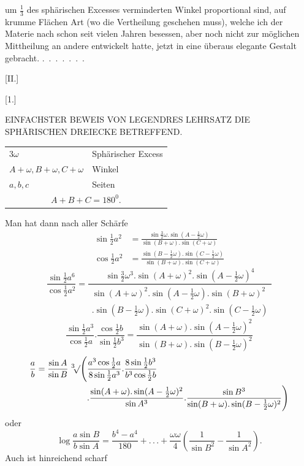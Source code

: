 %
um $\frac13$ des sphärischen Excesses verminderten Winkel proportional sind, auf krumme Flächen  Art (wo die Vertheilung  geschehen muss), welche ich der Materie nach schon seit vielen Jahren besessen, aber noch nicht zur möglichen Mittheilung an andere entwickelt hatte, jetzt in eine überaus elegante Gestalt gebracht. \mbox{. . . . . . .}
\par{}
\begin{center}[II.]\end{center}
\begin{center}[1.]\end{center}
\begin{center}EINFACHSTER BEWEIS VON LEGENDRES LEHRSATZ DIE SPHÄRISCHEN DREIECKE BETREFFEND.\end{center}
\begin{center}\begin{tabular}{ll}
$3\omega$ & Sphärischer Excess\\
$A+\omega,B+\omega,C+\omega$ & Winkel\\
$a,b,c$ & Seiten\\
\multicolumn{2}{c}{$A+B+C=180^0.$}
\end{tabular}\end{center}
\noindent\hspace*{1.2em}Man hat dann nach aller Schärfe
\[
\begin{aligned}
\sin\tfrac12 a^2&=\frac{\sin\tfrac32\omega.\sin(A-\tfrac12\omega)}{\sin(B+\omega).\sin(C+\omega)}\\
\cos\tfrac12 a^2&=\frac{\sin(B-\tfrac12\omega).\sin(C-\tfrac12\omega)}{\sin(B+\omega).\sin(C+\omega)}
\end{aligned}
\]
\[
\frac{\sin\frac12 a^6}{\cos\frac12 a^2}=\frac{\sin\frac32\omega^3.\sin(A+\omega)^2.\sin(A-\frac12\omega)^4}{\begin{gathered}\sin(A+\omega)^2.\sin(A-\frac12\omega).\sin(B+\omega)^2\\.\sin(B-\frac12\omega).\sin(C+\omega)^2.\sin(C-\frac12\omega)\end{gathered}}
\]
\[
\frac{\sin\frac12 a^3}{\cos\frac12 a}.\frac{\cos\frac12 b}{\sin\frac12 b^3}=\frac{\sin(A+\omega).\sin(A-\frac12\omega)^2}{\sin(B+\omega).\sin(B-\frac12\omega)^2}
\]
\[
\begin{aligned}
\frac ab=\frac{\sin A}{\sin B}\mkern6mu{}^3\mkern-4mu\mathord{\surd}\Biggl(&\frac{a^3\cos\frac12 a}{8\sin\frac12 a^3}.\frac{8\sin\frac12 b^3}{b^3\cos\frac12 b}\\
&.\frac{\sin(A+\omega).\sin(A-\frac12\omega)^2}{\sin A^3}.\frac{\sin B^3}{\sin(B+\omega).\sin(B-\frac12\omega)^2}\Biggr)
\end{aligned}
\]
\noindent oder
\[
\log\frac{a\sin B}{b\sin A}=\frac{b^4-a^4}{180}+.\, .\, .+\frac{\omega\omega}{4}\left(\frac{1}{\sin B^2}-\frac{1}{\sin A^2}\right).
\]
\noindent Auch ist hinreichend scharf
